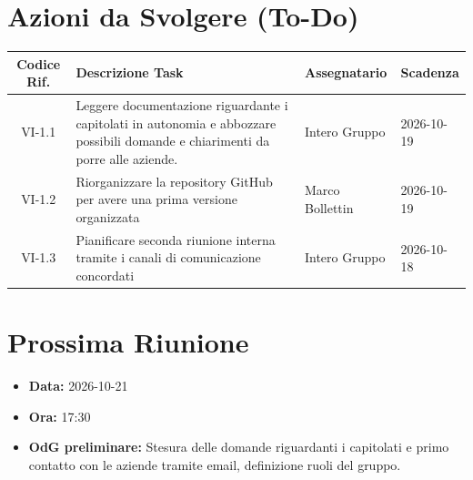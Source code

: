 \documentclass[a4paper, 11pt]{article}
\begin{document}
\vspace{0.5cm}
\section{Azioni da Svolgere (To-Do)}
\begin{tabularx}{\textwidth}{|c|X|l|l|}
\hline
\textbf{Codice Rif.} & \textbf{Descrizione Task} & \textbf{Assegnatario} & \textbf{Scadenza} \\ \hline
VI-1.1 & Leggere documentazione riguardante i capitolati in autonomia e abbozzare possibili domande e chiarimenti da porre alle aziende. & Intero Gruppo & 2026-10-19 \\ \hline
VI-1.2 & Riorganizzare la repository GitHub per avere una prima versione organizzata & Marco Bollettin & 2026-10-19 \\ \hline
VI-1.3 & Pianificare seconda riunione interna tramite i canali di comunicazione concordati & Intero Gruppo & 2026-10-18 \\ \hline

\end{tabularx}

\vspace{0.5cm}
\section{Prossima Riunione}
\begin{itemize}
    \item \textbf{Data:} 2026-10-21
    \item \textbf{Ora:} 17:30
    \item \textbf{OdG preliminare:} Stesura delle domande riguardanti i capitolati e primo contatto con le aziende tramite email, definizione ruoli del gruppo.
\end{itemize}
\end{document}
